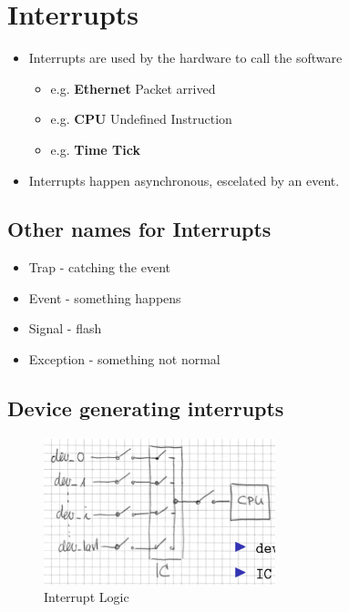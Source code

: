 \hypertarget{interrupts}{%
\section{Interrupts}\label{interrupts}}

\begin{itemize}
\tightlist
\item
  Interrupts are used by the hardware to call the software

  \begin{itemize}
  \tightlist
  \item
    e.g. \textbf{Ethernet} Packet arrived
  \item
    e.g. \textbf{CPU} Undefined Instruction
  \item
    e.g. \textbf{Time Tick}
  \end{itemize}
\item
  Interrupts happen asynchronous, escelated by an event.
\end{itemize}

\hypertarget{other-names-for-interrupts}{%
\subsection{Other names for
Interrupts}\label{other-names-for-interrupts}}

\begin{itemize}
\tightlist
\item
  Trap - catching the event
\item
  Event - something happens
\item
  Signal - flash
\item
  Exception - something not normal
\end{itemize}

\hypertarget{device-generating-interrupts}{%
\subsection{Device generating
interrupts}\label{device-generating-interrupts}}


\begin{figure}[H]
\centering
\includegraphics[width=0.6\textwidth]{figures/interruptLogic.png}
\caption{Interrupt Logic}
\end{figure}


